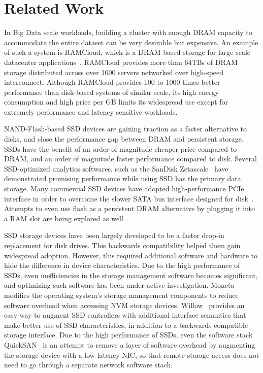 
\section{Related Work}
\label{sec:related}


In Big Data scale workloads, building a cluster with enough DRAM capacity to
accommodate the entire dataset can be very desirable but expensive. An example
of such a system is RAMCloud, which is a DRAM-based storage for large-scale
datacenter applications~\cite{ramcloud, rumble_log_dram}.  RAMCloud provides more than 64TBs of DRAM
storage distributed across over 1000 servers networked over high-speed
interconnect. Although RAMCloud provides 100 to 1000 times better performance
than disk-based systems of similar scale, its high energy consumption and high
price per GB limits its widespread use except for extremely performance and
latency sensitive workloads.

NAND-Flash-based SSD devices are gaining traction as a faster alternative to
disks, and close the performance gap between DRAM and persistent storage.
SSDs have the benefit of an order of magnitude cheaper price compared to DRAM,
and an order of magnitude faster performance compared to disk.
Several SSD-optimized analytics softwares, such as the SanDisk
Zetascale~\cite{zetascale} have demonstrated promising
performance while using SSD has the primary data storage.
Many commercial SSD devices have adopted high-performance PCIe interface in
order to overcome the slower SATA bus interface designed for
disk~\cite{fusionio, violinmemory, intelnvme}. Attempts to
even use flash as a persistent DRAM alternative by plugging it into a RAM slot
are being explored as well~\cite{diablotechnology}. 

SSD storage devices have been largely developed to be a faster drop-in
replacement for disk drives. This backwards compatibility helped them gain
widespread adoption.  However, this required additional software and hardware to
hide the difference in device characteristics.  Due to the high performance of
SSDs, even inefficiencies in the storage management software becomes
significant, and optimizing such software has been under active investigation.
Moneta~\cite{ucsd_moneta} modifies the operating system's storage management
components to reduce software overhead when accessing NVM storage devices.
Willow~\cite{ucsd_willow} provides an easy way to augment SSD controllers with
additional interface semantics that make better use of SSD characteristics, in
addition to a backwards compatible storage interface.  Due to the high
performance of SSDs, even the software stack QuickSAN~\cite{ucsd_quicksan} is an
attempt to remove a layer of software overhead by augmenting the storage device
with a low-latency NIC, so that remote storage access does not need to go
through a separate network software stack.


